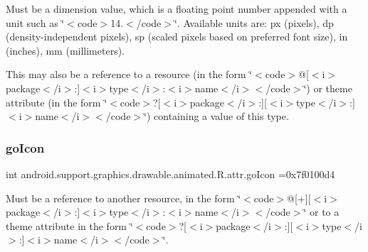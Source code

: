 Must be a dimension value, which is a floating point number appended with a unit such as \char`\"{}$<$code$>$14.\+5sp$<$/code$>$\char`\"{}. Available units are\+: px (pixels), dp (density-\/independent pixels), sp (scaled pixels based on preferred font size), in (inches), mm (millimeters). 

This may also be a reference to a resource (in the form \char`\"{}$<$code$>$@\mbox{[}$<$i$>$package$<$/i$>$\+:\mbox{]}$<$i$>$type$<$/i$>$\+:$<$i$>$name$<$/i$>$$<$/code$>$\char`\"{}) or theme attribute (in the form \char`\"{}$<$code$>$?\mbox{[}$<$i$>$package$<$/i$>$\+:\mbox{]}\mbox{[}$<$i$>$type$<$/i$>$\+:\mbox{]}$<$i$>$name$<$/i$>$$<$/code$>$\char`\"{}) containing a value of this type. \mbox{\label{classandroid_1_1support_1_1graphics_1_1drawable_1_1animated_1_1R_1_1attr_ab8cf6163c0aff6e2c0915a1081ee47da}} 
\subsubsection{\texorpdfstring{go\+Icon}{goIcon}}
{\footnotesize\ttfamily int android.\+support.\+graphics.\+drawable.\+animated.\+R.\+attr.\+go\+Icon =0x7f0100d4\hspace{0.3cm}{\ttfamily [static]}}

Must be a reference to another resource, in the form \char`\"{}$<$code$>$@\mbox{[}+\mbox{]}\mbox{[}$<$i$>$package$<$/i$>$\+:\mbox{]}$<$i$>$type$<$/i$>$\+:$<$i$>$name$<$/i$>$$<$/code$>$\char`\"{} or to a theme attribute in the form \char`\"{}$<$code$>$?\mbox{[}$<$i$>$package$<$/i$>$\+:\mbox{]}\mbox{[}$<$i$>$type$<$/i$>$\+:\mbox{]}$<$i$>$name$<$/i$>$$<$/code$>$\char`\"{}. \mbox{\label{classandroid_1_1support_1_1graphics_1_1drawable_1_1animated_1_1R_1_1attr_a6c66896e780a5792f1e4f64a3a8565a1}} 
